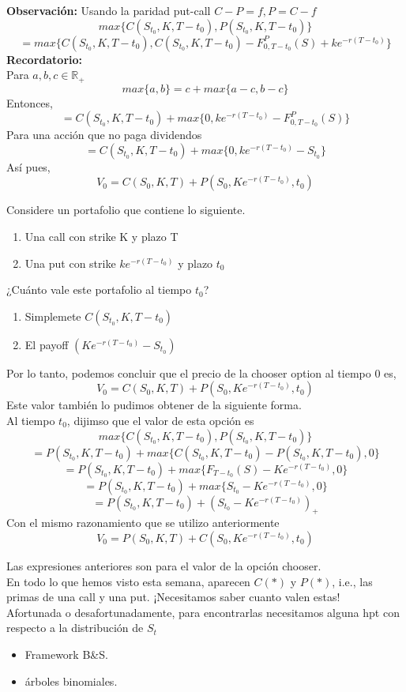 \documentclass[12pts]{extarticle}
\begin{document}
\textbf{Observación:} Usando la paridad put-call $C-P=f, P=C-f$
$$max\{C(S_{t_0},K,T-t_0), P(S_{t_0}, K, T-t_0)\}$$
$$=max\{C(S_{t_0},K,T-t_0), C(S_{t_0},K,T-t_0)-F_{0,T-t_0}^{P} (S)+ke^{-r(T-t_0)}\}$$
\textbf{Recordatorio:} \\
Para $a,b,c \in \mathbb{R}_+$
$$max\{a,b\}=c+max\{a-c,b-c\}$$ 
Entonces, 
$$=C(S_{t_0},K,T-t_0)+max\{0, ke^{-r(T-t_0)}-F_{0, T-t_0}^{P}(S)\}$$
Para una acción que no paga dividendos
$$=C(S_{t_0},K,T-t_0)+max\{0, ke^{-r(T-t_0)}-S_{t_0}\}$$
Así pues, 
$$V_0 = C(S_0,K,T)+ P(S_{0}, Ke^{-r(T-t_0)}, t_0)$$


Considere un portafolio que contiene lo siguiente.
\begin{enumerate}
\item Una call con strike K y plazo T 
\item Una put con strike $ke^{-r(T-t_0)}$ y plazo $t_0$ 
\end{enumerate}
¿Cuánto vale este portafolio al tiempo $t_0$?
\begin{enumerate}
\item Simplemete $C(S_{t_0}, K, T-t_0)$
\item El payoff $(Ke^{-r(T-t_0)}-S_{t_0})$
\end{enumerate}
Por lo tanto, podemos concluir que el precio de la chooser option al tiempo 0 es,
$$V_0=C(S_0,K,T)+P(S_0, Ke^{-r(T-t_0)}, t_0)$$
Este valor también lo pudimos obtener de la siguiente forma. \\
Al tiempo $t_0$, dijimso que el valor de esta opción es 
$$max\{C(S_{t_0}, K, T-t_0), P(S_{t_0},K,T-t_0)\}$$ 
$$=P(S_{t_0},K,T-t_0)+max\{C(S_{t_0},K,T-t_0)-P(S_{t_0},K,T-t_0),0 \}$$
$$=P(S_{t_0},K,T-t_0)+max\{F_{T-t_0}(S)-Ke^{-r(T-t_0)},0 \}$$
$$=P(S_{t_0},K,T-t_0)+max\{S_{t_0}-Ke^{-r(T-t_0)},0 \}$$
$$=P(S_{t_0},K,T-t_0)+(S_{t_0}-Ke^{-r(T-t_0)})_+$$
Con el mismo razonamiento que se utilizo anteriormente 
$$V_0= P(S_0,K,T)+C(S_0, Ke^{-r(T-t_0)}, t_0)$$

Las expresiones anteriores son para el valor de la opción chooser. \\ 
En todo lo que hemos visto esta semana, aparecen $C(*)$ y $P(*)$, i.e., las primas de una call y una put. ¡Necesitamos saber cuanto valen estas! 
\\ 
Afortunada o desafortunadamente, para encontrarlas necesitamos alguna hpt con respecto a la distribución de $S_t$ 
\begin{itemize}
\item Framework B\&S.
\item árboles binomiales.
\end{itemize} 
\end{document}
